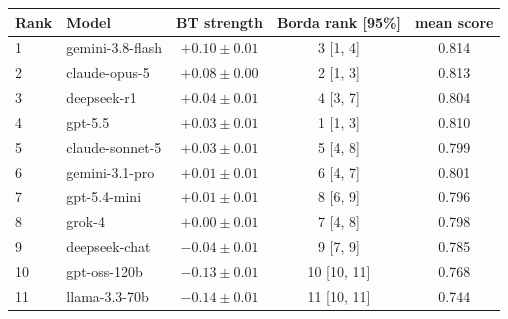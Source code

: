\begin{tabular}{llccc}
\toprule
Rank & Model & BT strength & Borda rank [95\%] & mean score \\
\midrule
1 & gemini-3.8-flash & $+0.10 \pm 0.01$ & 3 [1, 4] & 0.814 \\
2 & claude-opus-5 & $+0.08 \pm 0.00$ & 2 [1, 3] & 0.813 \\
3 & deepseek-r1 & $+0.04 \pm 0.01$ & 4 [3, 7] & 0.804 \\
4 & gpt-5.5 & $+0.03 \pm 0.01$ & 1 [1, 3] & 0.810 \\
5 & claude-sonnet-5 & $+0.03 \pm 0.01$ & 5 [4, 8] & 0.799 \\
6 & gemini-3.1-pro & $+0.01 \pm 0.01$ & 6 [4, 7] & 0.801 \\
7 & gpt-5.4-mini & $+0.01 \pm 0.01$ & 8 [6, 9] & 0.796 \\
8 & grok-4 & $+0.00 \pm 0.01$ & 7 [4, 8] & 0.798 \\
9 & deepseek-chat & $-0.04 \pm 0.01$ & 9 [7, 9] & 0.785 \\
10 & gpt-oss-120b & $-0.13 \pm 0.01$ & 10 [10, 11] & 0.768 \\
11 & llama-3.3-70b & $-0.14 \pm 0.01$ & 11 [10, 11] & 0.744 \\
\bottomrule
\end{tabular}
